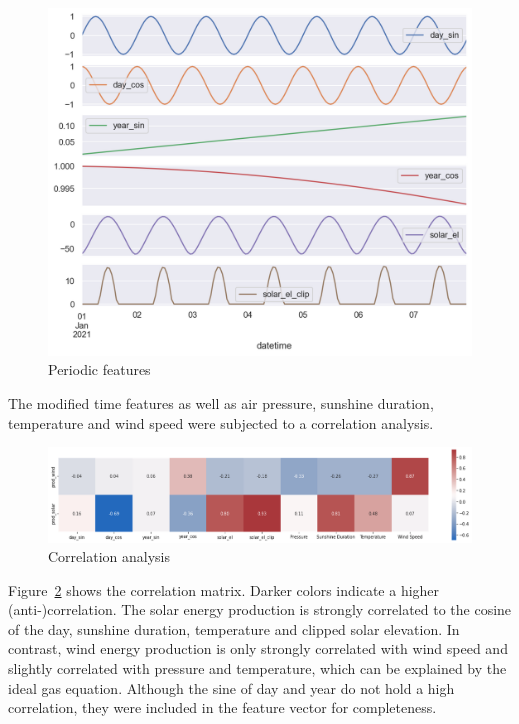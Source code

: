 \documentclass[11pt,table]{article}
\begin{document}
\begin{figure}[H]
	\centering
	\includegraphics[scale=0.7]{Figures/timeSignal.png}
	\caption{Periodic features}
	\label{fig:timeSignal}
\end{figure}

The modified time features as well as air pressure, sunshine duration, temperature and wind speed were subjected to a correlation analysis. 

\begin{figure}[H]
	\centering
	\includegraphics[scale=1]{Figures/correlation.png}
	\caption{Correlation analysis}
	\label{fig:correlation}
\end{figure}

Figure~\ref{fig:correlation} shows the correlation matrix. Darker colors indicate a higher (anti-)correlation. The solar energy production is strongly correlated to the cosine of the day, sunshine duration, temperature and clipped solar elevation. In contrast, wind energy production is only strongly correlated with wind speed and slightly correlated with pressure and temperature, which can be explained by the ideal gas equation. Although the sine of day and year do not hold a high correlation, they were included in the feature vector for completeness.
\end{document}
